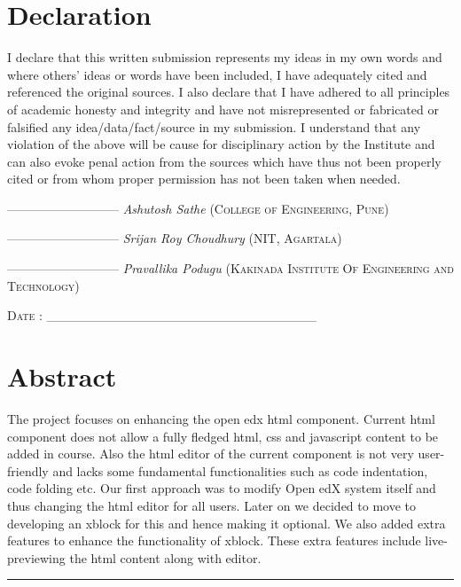 \documentclass[a4paper, twosided, openany]{memoir}
\begin{document}
\chapter*{Declaration}
\begin{center}
I declare that this written submission represents my ideas in my own words and where
others’ ideas or words have been included, I have adequately cited and referenced the
original sources. I also declare that I have adhered to all principles of academic
honesty and integrity and have not misrepresented or fabricated or falsified any
idea/data/fact/source in my submission. I understand that any violation of the above
will be cause for disciplinary action by the Institute and can also evoke penal action
from the sources which have thus not been properly cited or from whom proper
permission has not been taken when needed.
\end{center}
\vspace*{\fill}
\begin{center}
	\begin{flushleft}
		\bigskip
		\textsc{---------------------------}\newline
		\bigskip
		\emph{Ashutosh Sathe}\newline
                     \textsc{(College of Engineering, Pune)}

		\bigskip
		\bigskip
                    \bigskip
		\textsc{---------------------------}\newline
		\bigskip
		\emph{Srijan Roy Choudhury}\newline
                     \textsc{(NIT, Agartala)}

		\bigskip
		\bigskip
		\bigskip
		\textsc{---------------------------}\newline
		\bigskip
		\emph{Pravallika Podugu}\newline
                     \textsc{(Kakinada Institute Of Engineering and Technology)}

		\bigskip
		\bigskip
		\textsc{Date : \_\_\_\_\_\_\_\_\_\_\_\_\_\_\_\_\_\_\_\_\_\_\_\_\_\_\_\_\_}


	\end{flushleft}
\end{center}

\chapter*{Abstract}
The project focuses on enhancing the open edx html component. Current html component does not
allow a fully fledged html, css and javascript content to be added in course. Also the html editor of
the current component is not very user-friendly and lacks some fundamental functionalities such as
code indentation, code folding etc. Our first approach was to modify Open edX system itself and
thus changing the html editor for all users. Later on we decided to move to developing an xblock for
this and hence making it optional. We also added extra features to enhance the functionality of
xblock. These extra features include live-previewing the html content along with editor.\newline
\par\fancybreak{$***$}\par
\end{document}
